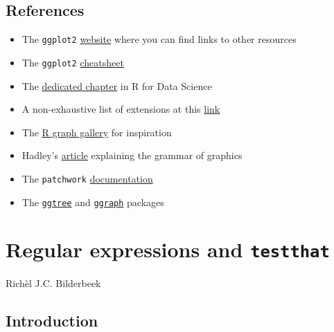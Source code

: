 \documentclass[]{book}
\providecommand{\tightlist}{%
  \setlength{\itemsep}{0pt}\setlength{\parskip}{0pt}}
\begin{document}
\hypertarget{references}{%
\section{References}\label{references}}

\begin{itemize}
\tightlist
\item
  The \texttt{ggplot2} \href{https://ggplot2.tidyverse.org/}{website} where you can find links to other resources
\item
  The \texttt{ggplot2} \href{https://rstudio.com/resources/cheatsheets/}{cheatsheet}
\item
  The \href{https://r4ds.had.co.nz/data-visualisation.html}{dedicated chapter} in R for Data Science
\item
  A non-exhaustive list of extensions at this \href{https://exts.ggplot2.tidyverse.org/gallery/}{link}
\item
  The \href{https://www.r-graph-gallery.com/}{R graph gallery} for inspiration
\item
  Hadley's \href{https://vita.had.co.nz/papers/layered-grammar.html}{article} explaining the grammar of graphics
\item
  The \texttt{patchwork} \href{https://patchwork.data-imaginist.com/}{documentation}
\item
  The \href{https://guangchuangyu.github.io/ggtree-book/chapter-ggtree.html}{\texttt{ggtree}} and \href{https://www.data-imaginist.com/2017/ggraph-introduction-layouts/}{\texttt{ggraph}} packages
\end{itemize}

\hypertarget{regular-expressions-and-testthat}{%
\chapter{\texorpdfstring{Regular expressions and \texttt{testthat}}{Regular expressions and testthat}}\label{regular-expressions-and-testthat}}

Richèl J.C. Bilderbeek

\hypertarget{introduction}{%
\section{Introduction}\label{introduction}}
\end{document}
